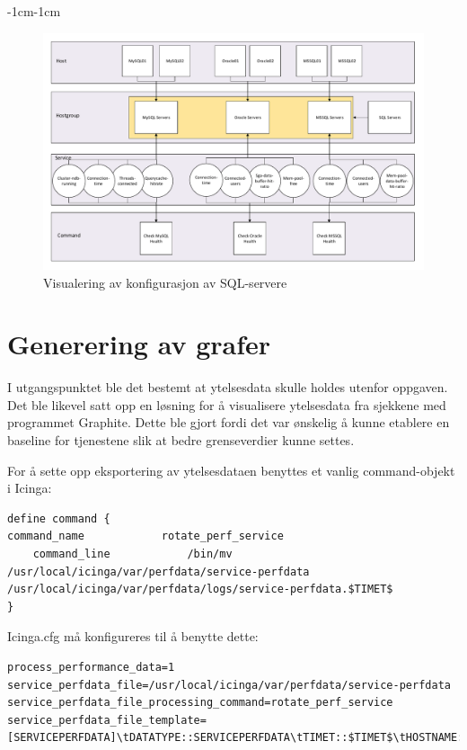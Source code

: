 \begin{changemargin}{-1cm}{-1cm}
\begin{figure}[H]
    \centering
    \includegraphics[scale=0.55]{img/sql}
    \caption{Visualering av konfigurasjon av SQL-servere}
    \label{sql}
\end{figure}
\end{changemargin}
\clearpage

\section{Generering av grafer}
I utgangspunktet ble det bestemt at ytelsesdata skulle holdes utenfor oppgaven. Det ble likevel satt opp en løsning for å visualisere ytelsesdata fra sjekkene med programmet Graphite\cite{graphite}. Dette ble gjort fordi det var ønskelig å kunne etablere en baseline for tjenestene slik at bedre grenseverdier kunne settes.

For å sette opp eksportering av ytelsesdataen benyttes et vanlig command-objekt i Icinga:

\begin{lstlisting}[style=example]
define command {
command_name            rotate_perf_service
    command_line            /bin/mv /usr/local/icinga/var/perfdata/service-perfdata /usr/local/icinga/var/perfdata/logs/service-perfdata.$TIMET$
}
\end{lstlisting}
 Icinga.cfg må konfigureres til å benytte dette:

\begin{lstlisting}[style=example]
process_performance_data=1
service_perfdata_file=/usr/local/icinga/var/perfdata/service-perfdata
service_perfdata_file_processing_command=rotate_perf_service
service_perfdata_file_template=[SERVICEPERFDATA]\tDATATYPE::SERVICEPERFDATA\tTIMET::$TIMET$\tHOSTNAME::$HOSTNAME$\tSERVICEDESC::$SERVICEDESC$\tSERVICEPERFDATA::$SERVICEPERFDATA$service_perfdata_file_processing_interval=200
\end{lstlisting}

